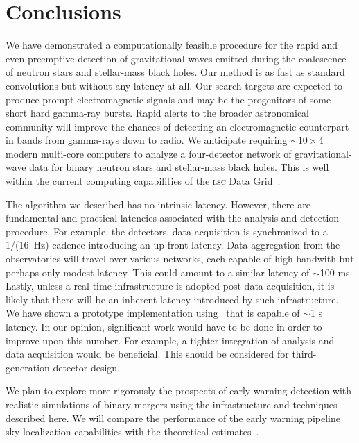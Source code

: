 \section{Conclusions}
\label{SECV}\label{sec:conclusions}

%
We have demonstrated a computationally feasible procedure for the rapid and even preemptive
detection of gravitational waves emitted during the coalescence of neutron
stars and stellar-mass black holes. Our method is as fast as standard \fft{}
convolutions but without any latency at all. Our search targets are expected to
produce prompt electromagnetic signals and may be the progenitors of some short
hard gamma-ray bursts.  Rapid alerts to the broader astronomical community will
improve the chances of detecting an electromagnetic counterpart in bands from
gamma-rays down to radio.  We anticipate requiring $\sim10\times4$ modern
multi-core computers to analyze a four-detector network of gravitational-wave data
for binary neutron stars and stellar-mass black holes.  This is well within the
current computing capabilities of the \textsc{lsc} Data Grid~\cite{LDG}.

The algorithm we described has no intrinsic latency.  However, there are
fundamental and practical latencies associated with the analysis and detection
procedure. For example, the \LIGO{} detectors, data acquisition is synchronized
to a 1/(16~Hz) cadence introducing an up-front latency.  Data
aggregation from the observatories will travel over various networks, each
capable of high bandwith but perhaps only modest latency.  This could amount to
a similar latency of $\sim$100 ms.  Lastly, unless a real-time infrastructure is
adopted post data acquisition, it is likely that there will be an inherent
latency introduced by such infrastructure.  We have shown a prototype
implementation using \gstlal\ that is capable of $\sim$1 s latency. In our
opinion, significant work would have to be done in order to improve upon this
number. For example, a tighter integration of analysis and data acquisition
would be beneficial. This should be considered for third-generation detector
design.

We plan to explore more rigorously the prospects of early warning detection
with realistic simulations of binary mergers using the infrastructure and
techniques described here.  We will compare the performance of the early
warning pipeline sky localization capabilities with the theoretical
estimates~\cite{Fairhurst2009}.

